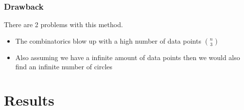 \documentclass[10pt,twoside]{scrreprt}
\begin{document}
\subsection{Drawback}

There are 2 problems with this method.

\begin{itemize}
\item The combinatorics blow up with a high number of data points \( {n}\choose{3} \)
\item Also assuming we have a infinite amount of data points then we would also find an infinite number of circles
\end{itemize}

\chapter{Results}
\end{document}
